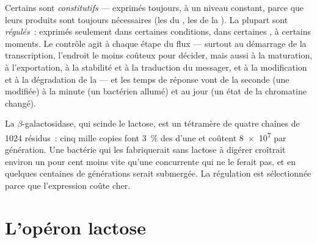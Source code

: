 \begin{proposition}\label{prop:b1:expression-control:levels}
Certains  sont \emph{constitutifs} --- exprimés toujours, à un
niveau constant, parce que leurs produits sont toujours nécessaires (les
 du , les  de la ). La plupart sont
\emph{régulés}~: exprimés seulement dans certaines conditions, dans
certaines , à certains moments. Le contrôle agit à chaque étape
du flux --- surtout au démarrage de la transcription, l'endroit le moins
coûteux pour décider, mais aussi à la maturation, à l'exportation, à la
stabilité et à la traduction du messager, et à la modification et à la
dégradation de la  --- et les temps de réponse vont de la
seconde (une  modifiée) à la minute (un  bactérien allumé)
et au jour (un état de la chromatine changé).
\end{proposition}

\begin{example}\label{ex:b1:expression-control:economy}
La $\beta$-galactosidase, qui scinde le lactose, est un tétramère de
quatre chaînes de \qty{1024}{} résidus~: cinq mille copies font
\qty{3}{\%} des  d'une  et coûtent \qty{8e7}{}  par
génération. Une bactérie qui les fabriquerait sans lactose à digérer
croîtrait environ un pour cent moins vite qu'une concurrente qui ne le
ferait pas, et en quelques centaines de générations serait submergée. La
régulation est sélectionnée parce que l'expression coûte cher.
\end{example}

\section{L'opéron lactose}

